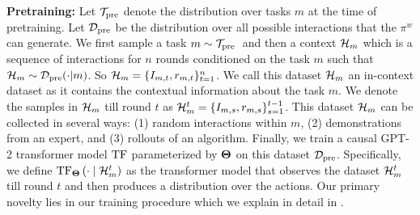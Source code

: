 \textbf{Pretraining:} Let $\mathcal{T}_{\text{pre}}$ denote the distribution over tasks $m$ at the time of pretraining. 
%
Let $\mathcal{D}_{\text{pre}}$ be the distribution over all possible interactions that the $\pi^w$ can generate.
%
We first sample a task $m\sim \mathcal{T}_{\text {pre }}$ and then a context $\mathcal{H}_m$ which is a sequence of interactions for $n$ rounds conditioned on the task $m$ such that $\mathcal{H}_m\sim\mathcal{D}_{\text{pre}}(\cdot|m)$.
%
%
So $\mathcal{H}_m = \{I_{m,t}, r_{m,t}\}_{t=1}^n$.
%
We call this dataset $\mathcal{H}_m$ an in-context dataset as it contains the contextual information about the task $m$. 
%
We denote the samples in $\mathcal{H}_m$ till round $t$ as $\mathcal{H}_{m}^t = \{I_{m,s}, r_{m,s}\}_{s=1}^{t-1}$. 
%
This dataset $\mathcal{H}_m$ can be collected in several ways: (1) random interactions within $m$, (2) demonstrations from an expert, and (3) rollouts of an algorithm. 
%
%
%
%
%
%
Finally, we train a causal GPT-2 transformer model $\mathrm{TF}$ parameterized by $\mathbf{\Theta}$ on this dataset $\mathcal{D}_{\text{pre}}$. 
%
Specifically, we define $\mathrm{TF}_{\mathbf{\Theta}}\left(\cdot \mid \mathcal{H}^t_m\right)$ as the transformer model that observes the dataset $\mathcal{H}^t_m$ till round $t$ and then produces a distribution over the actions.
%
Our primary novelty lies in our training procedure which we explain in detail in . 

